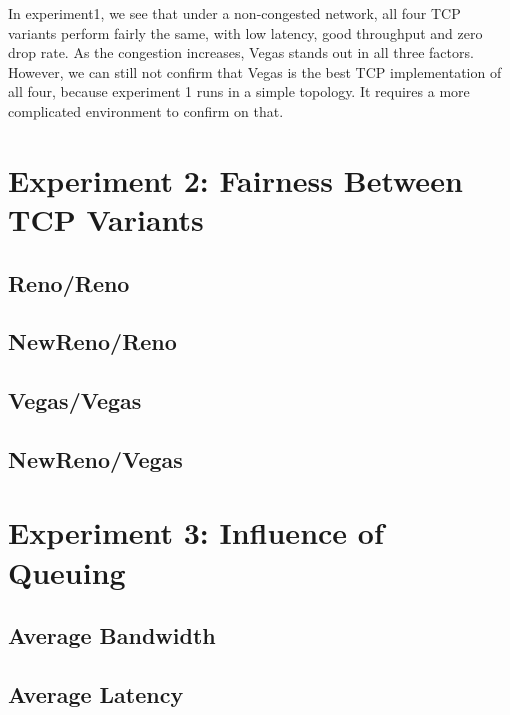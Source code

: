 \documentclass[10pt, conference]{lib/IEEEtran}
\begin{document}
In experiment1, we see that under a non-congested network, all four TCP
variants perform fairly the same, with low latency, good throughput and
zero drop rate. As the congestion increases, Vegas stands out in all 
three factors. However, we can still not confirm that Vegas is the best
TCP implementation of all four, because experiment 1 runs in a simple
topology. It requires a more complicated environment to confirm on that.




\section{Experiment 2: Fairness Between TCP Variants}


\subsection{Reno/Reno}


\subsection{NewReno/Reno}


\subsection{Vegas/Vegas}


\subsection{NewReno/Vegas}



\section{Experiment 3: Influence of Queuing}


\subsection{Average Bandwidth}


\subsection{Average Latency}
\end{document}
